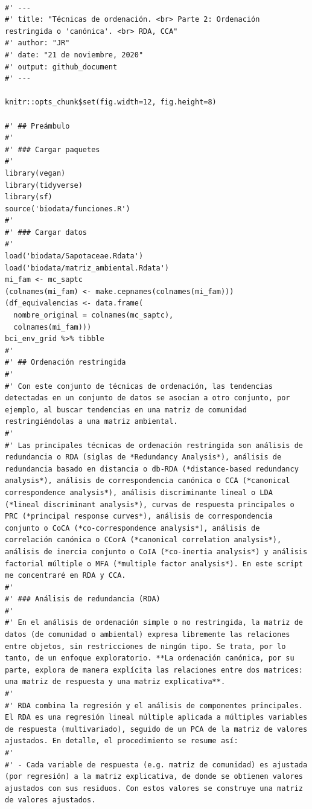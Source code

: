 \documentclass[11pt,]{article}
\begin{document}
\begin{verbatim}

#' ---
#' title: "Técnicas de ordenación. <br> Parte 2: Ordenación restringida o 'canónica'. <br> RDA, CCA"
#' author: "JR"
#' date: "21 de noviembre, 2020"
#' output: github_document
#' ---

knitr::opts_chunk$set(fig.width=12, fig.height=8)

#' ## Preámbulo
#' 
#' ### Cargar paquetes
#' 
library(vegan)
library(tidyverse)
library(sf)
source('biodata/funciones.R')
#' 
#' ### Cargar datos
#' 
load('biodata/Sapotaceae.Rdata')
load('biodata/matriz_ambiental.Rdata')
mi_fam <- mc_saptc
(colnames(mi_fam) <- make.cepnames(colnames(mi_fam)))
(df_equivalencias <- data.frame(
  nombre_original = colnames(mc_saptc),
  colnames(mi_fam)))
bci_env_grid %>% tibble
#' 
#' ## Ordenación restringida
#' 
#' Con este conjunto de técnicas de ordenación, las tendencias detectadas en un conjunto de datos se asocian a otro conjunto, por ejemplo, al buscar tendencias en una matriz de comunidad  restringiéndolas a una matriz ambiental.
#' 
#' Las principales técnicas de ordenación restringida son análisis de redundancia o RDA (siglas de *Redundancy Analysis*), análisis de redundancia basado en distancia o db-RDA (*distance-based redundancy analysis*), análisis de correspondencia canónica o CCA (*canonical correspondence analysis*), análisis discriminante lineal o LDA (*lineal discriminant analysis*), curvas de respuesta principales o PRC (*principal response curves*), análisis de correspondencia conjunto o CoCA (*co-correspondence analysis*), análisis de correlación canónica o CCorA (*canonical correlation analysis*), análisis de inercia conjunto o CoIA (*co-inertia analysis*) y análisis factorial múltiple o MFA (*multiple factor analysis*). En este script me concentraré en RDA y CCA.
#' 
#' ### Análisis de redundancia (RDA)
#' 
#' En el análisis de ordenación simple o no restringida, la matriz de datos (de comunidad o ambiental) expresa libremente las relaciones entre objetos, sin restricciones de ningún tipo. Se trata, por lo tanto, de un enfoque exploratorio. **La ordenación canónica, por su parte, explora de manera explícita las relaciones entre dos matrices: una matriz de respuesta y una matriz explicativa**.
#' 
#' RDA combina la regresión y el análisis de componentes principales. El RDA es una regresión lineal múltiple aplicada a múltiples variables de respuesta (multivariado), seguido de un PCA de la matriz de valores ajustados. En detalle, el procedimiento se resume así:
#' 
#' - Cada variable de respuesta (e.g. matriz de comunidad) es ajustada (por regresión) a la matriz explicativa, de donde se obtienen valores ajustados con sus residuos. Con estos valores se construye una matriz de valores ajustados.

\end{verbatim}
\end{document}
